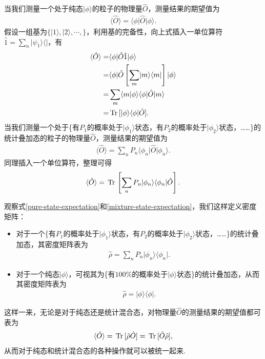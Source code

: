 \documentclass{assignment}
\begin{document}
当我们测量一个处于纯态$\lvert\phi\rangle$的粒子的物理量$\hat{O}$，测量结果的期望值为
\begin{align}
    \langle\hat{O}\rangle=\langle\phi\rvert\hat{O}\lvert\phi\rangle.
\end{align}
假设一组基为$\{\lvert 1\rangle,\lvert 2\rangle,\cdots,\}$，利用基的完备性，向上式插入一单位算符$\hat{1}=\sum_n\lvert\psi_1\rangle\langle\rvert$，有
\begin{align}
    \label{mixture-state-expectation}
    \notag\langle\hat{O}\rangle=&\langle\phi\rvert\hat{O}\hat{1}\lvert\phi\rangle\\
    \notag=&\langle\phi\rvert\hat{O}\left[\sum_m\lvert m\rangle\langle m\rvert\right]\lvert\phi\rangle\\
    \notag=&\sum_m\langle m\vert\phi\rangle\langle\phi\rvert\hat{O}\lvert m\rangle\\
    =&\,\text{Tr}\,[\lvert\phi\rangle\langle\phi\rvert\hat{O}].
\end{align}
当我们测量一个处于\{有$P_1$的概率处于$\lvert\phi_1\rangle$状态，有$P_2$的概率处于$\lvert\phi_2\rangle$状态，……\}的统计叠加态的粒子的物理量$\hat{O}$，测量结果的期望值为
\begin{align}
    \langle\hat{O}\rangle=\sum_nP_n\langle\phi_n\rvert\hat{O}\lvert\phi_n\rangle.
\end{align}
同理插入一个单位算符，整理可得
\begin{align}
    \label{pure-state-expectation}
    \langle\hat{O}\rangle=\,\text{Tr}\,\left[\sum_nP_n\lvert\phi_n\rangle\langle\phi_n\rvert\hat{O}\right].
\end{align}

观察式\eqref{pure-state-expectation}和\eqref{mixture-state-expectation}，我们这样定义密度矩阵：
\begin{itemize}
    \item 对于一个\{有$P_1$的概率处于$\lvert\phi_1\rangle$状态，有$P_2$的概率处于$\lvert\phi_2\rangle$状态，……\}的统计叠加态，其密度矩阵表为
    \begin{align}
        \hat{\rho}=\sum_nP_n\lvert\phi_n\rangle\langle\phi_n\rvert.
    \end{align}
    \item 对于一个纯态$\lvert\phi\rangle$，可视其为\{有$100\%$的概率处于$\lvert\phi\rangle$状态\}的统计叠加态，从而其密度矩阵表为
    \begin{align}
        \hat{\rho}=\lvert\phi\rangle\langle\phi\rvert.
    \end{align}
\end{itemize}
这样一来，无论是对于纯态还是统计混合态，对物理量$\hat{O}$的测量结果的期望值都可表为
\begin{align}
    \langle\hat{O}\rangle=\,\text{Tr}\,[\hat{\rho}\hat{O}]=\,\text{Tr}\,[\hat{O}\hat{\rho}],
\end{align}
从而对于纯态和统计混合态的各种操作就可以被统一起来.
\end{document}
